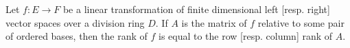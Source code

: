 Let $f : E \to F$ be a linear transformation of finite dimensional left [resp. right] vector spaces over a division ring $D$. If $A$ is the matrix of $f$ relative to some pair of ordered bases, then the rank of $f$ is equal to the row [resp. column] rank of $A$.
